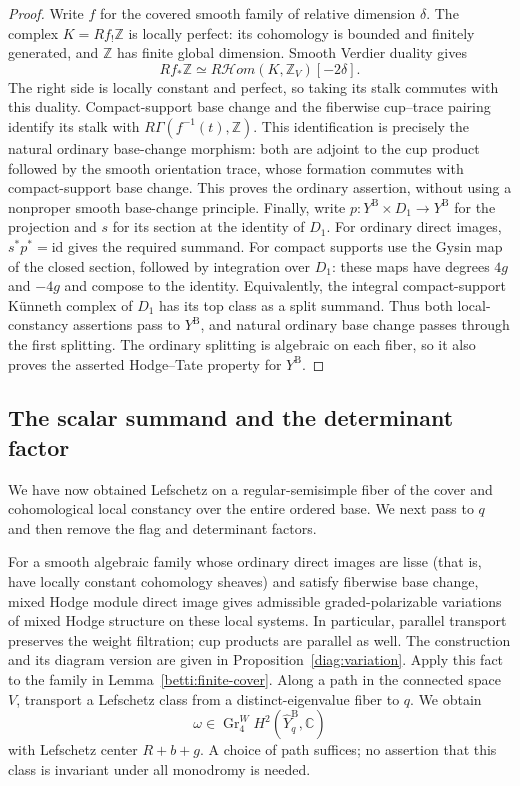 \begin{proof}
Write $f$ for the covered smooth family of relative dimension
$\delta$.  The complex $K=Rf_!\mathbb Z$ is locally perfect: its
cohomology is bounded and finitely generated, and $\mathbb Z$ has
finite global dimension.  Smooth Verdier duality gives
\[
 Rf_*\mathbb Z\simeq
 R\mathcal Hom(K,\mathbb Z_V)[-2\delta].
\]
The right side is locally constant and perfect, so taking its stalk
commutes with this duality.  Compact-support base change and the
fiberwise cup--trace pairing identify its stalk with
$R\Gamma(f^{-1}(t),\mathbb Z)$.  This identification is precisely the
natural ordinary base-change morphism: both are adjoint to the cup
product followed by the smooth orientation trace, whose formation
commutes with compact-support base change.  This proves the ordinary
assertion, without using a nonproper smooth base-change principle.
Finally, write $p:Y^{\mathrm B}\times D_1\to Y^{\mathrm B}$ for the
projection and $s$ for its section at the identity of $D_1$.  For ordinary
direct images, $s^*p^*=\mathrm{id}$ gives the required summand.  For
compact supports use the Gysin map of the closed section, followed by
integration over $D_1$: these maps have degrees $4g$ and $-4g$ and
compose to the identity.  Equivalently, the integral compact-support
K\"unneth complex of $D_1$ has its top class as a split summand.  Thus
both local-constancy assertions pass to $Y^{\mathrm B}$, and natural
ordinary base change passes through the first splitting.  The ordinary
splitting is algebraic on each fiber, so it also proves the asserted
Hodge--Tate property for $Y^{\mathrm B}$.
\end{proof}

\subsection{The scalar summand and the determinant factor}

We have now obtained Lefschetz on a regular-semisimple fiber of the
cover and cohomological local constancy over the entire ordered base.
We next pass to $q$ and then remove the flag and determinant factors.

For a smooth algebraic family whose ordinary direct images are lisse (that is, have locally constant
cohomology sheaves) and satisfy fiberwise base change, mixed Hodge module direct image
gives admissible graded-polarizable variations of mixed Hodge
structure on these local systems.  In particular, parallel transport
preserves the weight filtration; cup products are parallel as well.
The construction and its diagram version are given in
Proposition~\ref{diag:variation}.  Apply this fact to the family in
Lemma~\ref{betti:finite-cover}.  Along a path in the connected space
$V$, transport a Lefschetz class from a distinct-eigenvalue fiber to
$q$.  We obtain
\[
 \omega\in\operatorname{Gr}^W_4
 H^2(\widehat Y^{\mathrm B}_q,\mathbb C)
\]
with Lefschetz center $R+b+g$.  A choice of path suffices; no assertion
that this class is invariant under all monodromy is needed.

